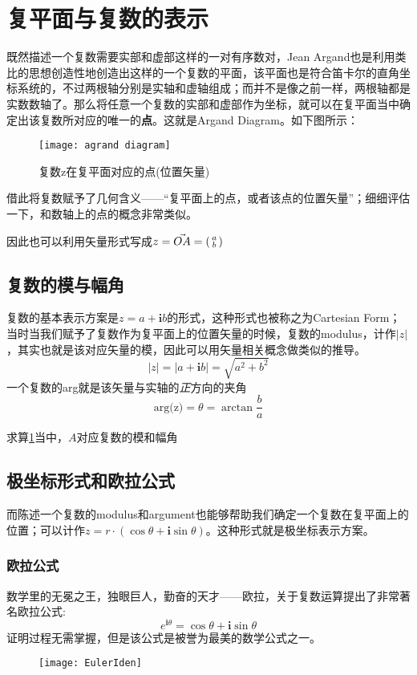 \section{复平面与复数的表示}
既然描述一个复数需要实部和虚部这样的一对有序数对，Jean Argand也是利用类比的思想创造性地创造出这样的一个复数的平面，该平面也是符合笛卡尔的直角坐标系统的，不过两根轴分别是实轴和虚轴组成；而并不是像之前一样，两根轴都是实数数轴了。那么将任意一个复数的实部和虚部作为坐标，就可以在复平面当中确定出该复数所对应的唯一的\textbf{点}。这就是Argand Diagram。如下图所示：
\begin{figure}[H]
\centering
\texttt{[image: agrand diagram]}
\label{fig:argand 34}
\caption{复数z在复平面对应的点(位置矢量)}
\end{figure}

借此将复数赋予了几何含义——``复平面上的点，或者该点的位置矢量''；细细评估一下，和数轴上的点的概念非常类似。

因此也可以利用矢量形式写成$z=\vec{OA}=\left(\begin{smallmatrix}a\\b\end{smallmatrix}\right)$

\subsection*{复数的模与幅角}
复数的基本表示方案是$z=a+\mathbf{i} b$的形式，这种形式也被称之为Cartesian Form；当时当我们赋予了复数作为复平面上的位置矢量的时候，复数的\gls{modulus}，计作$|z|$，其实也就是该对应矢量的模，因此可以用矢量相关概念做类似的推导。
\[
	|z|=|a+\mathbf{i} b|=\sqrt{a^2+b^2}
\]
一个复数的\gls{arg}就是该矢量与实轴的\emph{正}方向的夹角
\[
	\text{arg(z)}=\theta = \arctan \frac{b}{a}
\]
\begin{TaskBox}
求算\ref{fig:argand 34}当中，$A$对应复数的模和幅角
\end{TaskBox}

\subsection*{极坐标形式和欧拉公式}
而陈述一个复数的modulus和argument也能够帮助我们确定一个复数在复平面上的位置；可以计作$z=r\cdot (\cos \theta + \mathbf{i} \sin \theta)$。这种形式就是极坐标表示方案。

\subsubsection*{欧拉公式}
数学里的无冕之王，独眼巨人，勤奋的天才——欧拉，关于复数运算提出了非常著名欧拉公式:
\[
	e^{\mathbf{i} \theta} =\cos \theta +\mathbf{i} \sin\theta
\]
证明过程无需掌握，但是该公式是被誉为最美的数学公式之一。
\begin{figure}[H]
\centering
\texttt{[image: EulerIden]}
\end{figure}

